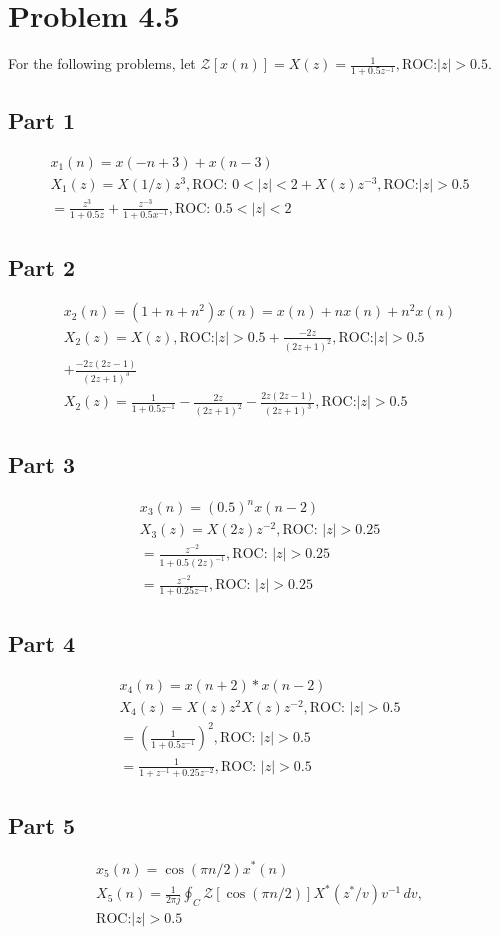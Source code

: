 \documentclass{article}
\begin{document}
\section*{Problem 4.5}
For the following problems, let \(\mathcal{Z}[x(n)] =
X(z) = \frac{1}{1 + 0.5z^{-1}}, \text{ROC:} |z| > 0.5\).

\subsection*{Part 1}
\begin{gather*}
    x_1(n) = x(-n + 3) + x(n - 3)\\
    X_1(z) = X(1/z)z^3, \text{ROC: } 0 < |z| < 2 + X(z)z^{-3},  \text{ROC:} |z| > 0.5\\
    = \frac{z^3}{1 + 0.5z} + \frac{z^{-3}}{1+0.5x^{-1}}, \text{ROC: } 0.5 < |z| < 2
\end{gather*}

\subsection*{Part 2}
\begin{gather*}
    x_2(n) = (1 + n + n^2)x(n) = x(n) + nx(n) + n^2x(n)\\
    X_2(z) = X(z), \text{ROC:} |z| > 0.5 + \frac{-2z}{(2z+1)^2}, \text{ROC:} |z| > 0.5\\
    +\frac{-2z(2z-1)}{(2z+1)^3}\\
    X_2(z) = \frac{1}{1+0.5z^{-1}} - \frac{2z}{(2z+1)^2} - \frac{2z(2z-1)}{(2z+1)^3},  \text{ROC:} |z| > 0.5
\end{gather*}

\subsection*{Part 3}
\begin{gather*}
    x_3(n) = \left(0.5\right)^n x(n-2)\\
    X_3(z) = X(2z)z^{-2}, \text{ROC: } |z| > 0.25\\
    = \frac{z^{-2}}{1 + 0.5(2z)^{-1}}, \text{ROC: } |z| > 0.25\\
    = \frac{z^{-2}}{1 + 0.25z^{-1}}, \text{ROC: } |z| > 0.25
\end{gather*}

\subsection*{Part 4}
\begin{gather*}
    x_4(n) = x(n + 2) * x(n - 2)\\
    X_4(z) = X(z)z^{2}X(z)z^{-2}, \text{ROC: } |z| > 0.5\\
    = \left(\frac{1}{1+0.5z^{-1}}\right)^2, \text{ROC: } |z| > 0.5\\
    = \frac{1}{1 + z^{-1} + 0.25z^{-2}}, \text{ROC: } |z| > 0.5
\end{gather*}

\subsection*{Part 5}
\begin{gather*}
    x_5(n) = \cos(\pi n/2)x^*(n)\\
    X_5(n) = \frac{1}{2\pi j} \oint_C \mathcal{Z}[\cos(\pi n/2)]X^*(z^*/v)v^{-1}\,dv,\\
    \text{ROC:} |z| > 0.5
\end{gather*}
\end{document}
